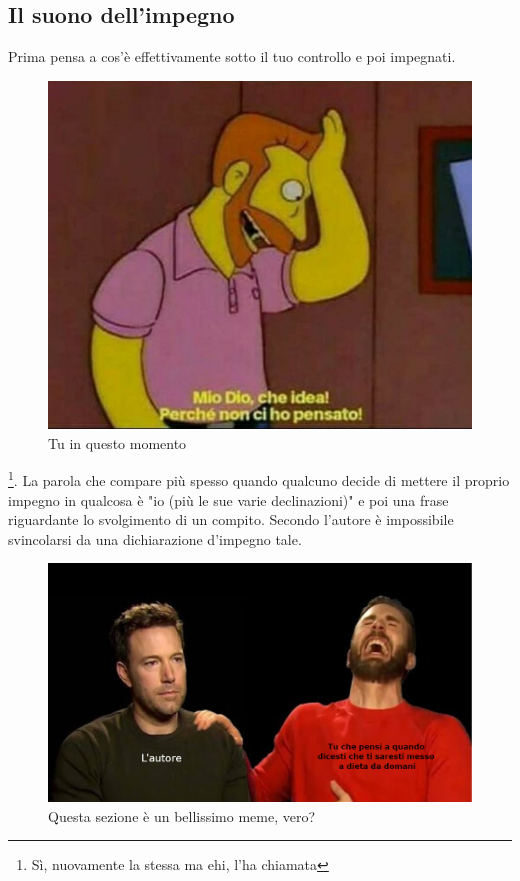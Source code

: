 \documentclass[11pt,a4paper]{book}
\begin{document}
\subsection{Il suono dell'impegno}
Prima pensa a cos'è effettivamente sotto il tuo controllo e poi impegnati.
\begin{figure}[h!]
	\begin{center}
		\includegraphics[scale=0.3]{img/001.jpg}
		\caption{Tu in questo momento}
		\label{fig: 0012}
	\end{center}
\end{figure}
\footnote{Sì, nuovamente la stessa ma ehi, l'ha chiamata}.
La parola che compare più spesso quando qualcuno decide di mettere il proprio impegno in qualcosa è "io (più le sue varie declinazioni)" e poi una frase riguardante lo svolgimento di un compito. Secondo l'autore è impossibile svincolarsi da una dichiarazione d'impegno tale.
\begin{figure}[h!]
	\begin{center}
		\includegraphics[scale=0.45]{img/002.jpg}
		\caption{Questa sezione è un bellissimo meme, vero?}
		\label{fig: 002}
	\end{center}
\end{figure}
\end{document}

